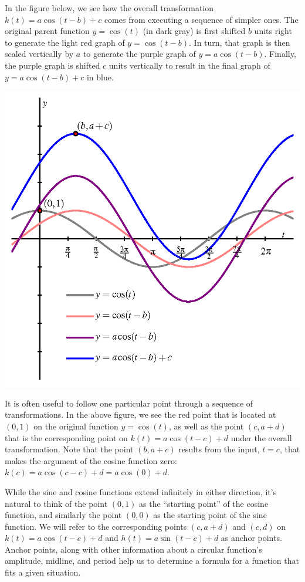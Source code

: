 \documentclass{ximera}
\begin{document}
In the figure below, we see how the overall transformation \(k(t) = a\cos(t-b)+c\) comes from executing a sequence of simpler ones.  The original parent function \(y = \cos(t)\) (in dark gray) is first shifted \(b\) units right to generate the light red graph of \(y = \cos(t - b)\).  In turn, that graph is then scaled vertically by \(a\) to generate the purple graph of \(y = a\cos(t-b)\).  Finally, the purple graph is shifted \(c\) units vertically to result in the final graph of \(y = a\cos(t-b) + c\) in blue.%
\begin{image}
\includegraphics[width=0.8\linewidth]{images/sinusoidal-transformed-cosine.png}
\end{image}
It is often useful to follow one particular point through a sequence of transformations.  In the above figure, we see the red point that is located at \((0,1)\) on the original function \(y = \cos(t)\), as well as the point \((c, a+d)\) that is the corresponding point on \(k(t) = a\cos(t-c) + d\) under the overall transformation.  Note that the point \((b,a+c)\) results from the input, \(t = c\), that makes the argument of the cosine function zero:  \(k(c) = a\cos(c-c) + d = a\cos(0) + d\).%

While the sine and cosine functions extend infinitely in either direction, it's natural to think of the point \((0,1)\) as the ``starting point'' of the cosine function, and similarly the point \((0,0)\) as the starting point of the sine function.  We will refer to the corresponding points \((c,a+d)\) and \((c,d)\) on \(k(t) = a\cos(t-c) + d\) and \(h(t) = a\sin(t-c) + d\) as anchor points. Anchor points, along with other information about a circular function's amplitude, midline, and period help us to determine a formula for a function that fits a given situation.%
\end{document}

